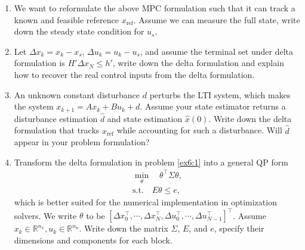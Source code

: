\begin{enumerate}
    \item \label{ex6:1} We want to reformulate the above MPC formulation such that it can track a known and feasible reference $x_{\text{ref}}$. Assume we can measure the full state, write down the steady state condition for $u_s$. \vspace{5\baselineskip}

    \item Let $\Delta x_k = x_k - x_s$, $\Delta u_k = u_k-u_s$, and assume the terminal set under delta formulation is $H'\Delta x_N\leq h'$, write down the delta formulation and explain how to recover the real control inputs from the delta formulation.\vspace{5\baselineskip}
    \item \label{ex6:1} An unknown constant disturbance $d$ perturbs the LTI system, which makes the system $x_{k+1} = Ax_k + Bu_k + d$. Assume your state estimator returns a disturbance estimation $\hat{d}$ and state estimation $\hat{x}(0)$. Write down the delta formulation that tracks $x_{\text{ref}}$ while accounting for such a disturbance. Will $\hat{d}$ appear in your problem formulation?\vspace{5\baselineskip}
    \item Transform the delta formulation in problem \ref{ex6:1} into a general QP form
    \begin{align*}
        \min_{\theta} \quad \theta^{\top}\Sigma\theta,\\
        \text{s.t.} \quad E\theta \leq e,
    \end{align*}
    which is better suited for the numerical implementation in optimization solvers. We write $\theta$ to be $[\Delta x_0^{\top},\cdots,\Delta x_N^{\top},\Delta u_0^{\top},\cdots,\Delta u_{N-1}^{\top}]^{\top}$. Assume $x_k \in \mathbb{R}^{n_x},u_k \in \mathbb{R}^{n_u}$.
    Write down the matrix $\Sigma$, $E$, and $e$, specify their dimensions and components for each block.
\end{enumerate}